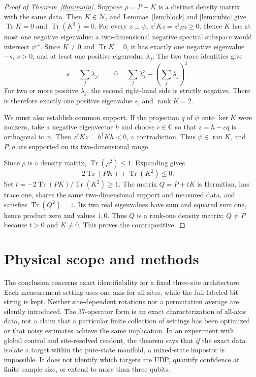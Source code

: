 \documentclass[aps,pra,reprint,onecolumn,superscriptaddress]{revtex4-2}
\newcommand{\NN}{\mathcal N}
\newcommand{\Tr}{\operatorname{Tr}}
\newcommand{\rank}{\operatorname{rank}}
\begin{document}
\begin{proof}[Proof of Theorem~\ref{thm:main}]
Suppose \(\rho=P+K\) is a distinct density matrix with the same data. Then \(K\in\NN\), and Lemmas~\ref{lem:block} and \ref{lem:cubic} give \(\Tr K=0\) and \(\Tr(K^3)=0\).
For every \(z\perp\psi\), \(z^\dagger Kz=z^\dagger\rho z\ge0\). Hence \(K\) has at most one negative eigenvalue: a two-dimensional negative spectral subspace would intersect \(\psi^\perp\). Since \(K\ne0\) and \(\Tr K=0\), it has exactly one negative eigenvalue \(-s\), \(s>0\), and at least one positive eigenvalue \(\lambda_j\). The two trace identities give
\[
 s=\sum_j\lambda_j,\qquad
 0=\sum_j\lambda_j^3-\left(\sum_j\lambda_j\right)^3.
\]
For two or more positive \(\lambda_j\), the second right-hand side is strictly negative. There is therefore exactly one positive eigenvalue \(s\), and \(\rank K=2\).

We must also establish common support. If the projection \(q\) of \(\psi\) onto \(\ker K\) were nonzero, take a negative eigenvector \(h\) and choose \(c\in\mathbb C\) so that \(z=h-cq\) is orthogonal to \(\psi\). Then \(z^\dagger Kz=h^\dagger Kh<0\), a contradiction. Thus \(\psi\in\operatorname{ran}K\), and \(P,\rho\) are supported on its two-dimensional range.

Since \(\rho\) is a density matrix, \(\Tr(\rho^2)\le1\). Expanding gives
\[
 2\Tr(PK)+\Tr(K^2)\le0.
\]
Set \(t=-2\Tr(PK)/\Tr(K^2)\ge1\). The matrix \(Q=P+tK\) is Hermitian, has trace one, shares the same two-dimensional support and measured data, and satisfies \(\Tr(Q^2)=1\). Its two real eigenvalues have sum and squared sum one, hence product zero and values \(1,0\). Thus \(Q\) is a rank-one density matrix; \(Q\ne P\) because \(t>0\) and \(K\ne0\). This proves the contrapositive.
\end{proof}

\section{Physical scope and methods}

The conclusion concerns exact identifiability for a fixed three-site architecture. Each measurement setting uses one axis for all sites, while the full labeled bit string is kept. Neither site-dependent rotations nor a permutation average are silently introduced. The 37-operator form is an exact characterization of all-axis data, not a claim that a particular finite collection of settings has been optimized or that noisy estimates achieve the same implication. In an experiment with global control and site-resolved readout, the theorem says that \emph{if} the exact data isolate a target within the pure-state manifold, a mixed-state impostor is impossible. It does not identify which targets are UDP, quantify confidence at finite sample size, or extend to more than three qubits.
\end{document}
